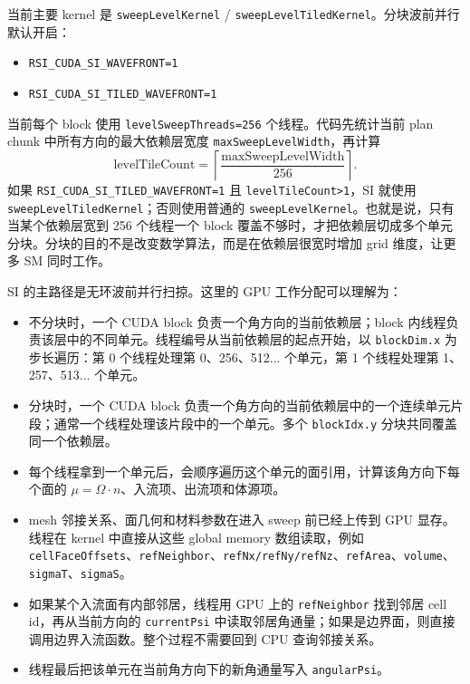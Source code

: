 \documentclass[10pt]{article}
\newcommand{\subsect}[1]{\vspace{2mm}{\sffamily\large\bfseries #1}\par}
\newcommand{\code}[1]{\texttt{#1}}
\begin{document}
当前主要 kernel 是 \code{sweepLevelKernel} / \code{sweepLevelTiledKernel}。分块波前并行默认开启：

\begin{itemize}
\item \code{RSI\_CUDA\_SI\_WAVEFRONT=1}
\item \code{RSI\_CUDA\_SI\_TILED\_WAVEFRONT=1}
\end{itemize}

当前每个 block 使用 \code{levelSweepThreads=256} 个线程。代码先统计当前 plan chunk 中所有方向的最大依赖层宽度 \code{maxSweepLevelWidth}，再计算
\[
\text{levelTileCount}=\left\lceil \frac{\text{maxSweepLevelWidth}}{256}\right\rceil .
\]
如果 \code{RSI\_CUDA\_SI\_TILED\_WAVEFRONT=1} 且 \code{levelTileCount>1}，SI 就使用 \code{sweepLevelTiledKernel}；否则使用普通的 \code{sweepLevelKernel}。也就是说，只有当某个依赖层宽到 256 个线程一个 block 覆盖不够时，才把依赖层切成多个单元分块。分块的目的不是改变数学算法，而是在依赖层很宽时增加 grid 维度，让更多 SM 同时工作。

\subsect{3.3 SI 中线程具体做什么}

SI 的主路径是无环波前并行扫掠。这里的 GPU 工作分配可以理解为：

\begin{itemize}
\item 不分块时，一个 CUDA block 负责一个角方向的当前依赖层；block 内线程负责该层中的不同单元。线程编号从当前依赖层的起点开始，以 \code{blockDim.x} 为步长遍历：第 0 个线程处理第 0、256、512... 个单元，第 1 个线程处理第 1、257、513... 个单元。
\item 分块时，一个 CUDA block 负责一个角方向的当前依赖层中的一个连续单元片段；通常一个线程处理该片段中的一个单元。多个 \code{blockIdx.y} 分块共同覆盖同一个依赖层。
\item 每个线程拿到一个单元后，会顺序遍历这个单元的面引用，计算该角方向下每个面的 $\mu=\Omega\cdot n$、入流项、出流项和体源项。
\item mesh 邻接关系、面几何和材料参数在进入 sweep 前已经上传到 GPU 显存。线程在 kernel 中直接从这些 global memory 数组读取，例如 \code{cellFaceOffsets}、\code{refNeighbor}、\code{refNx/refNy/refNz}、\code{refArea}、\code{volume}、\code{sigmaT}、\code{sigmaS}。
\item 如果某个入流面有内部邻居，线程用 GPU 上的 \code{refNeighbor} 找到邻居 cell id，再从当前方向的 \code{currentPsi} 中读取邻居角通量；如果是边界面，则直接调用边界入流函数。整个过程不需要回到 CPU 查询邻接关系。
\item 线程最后把该单元在当前角方向下的新角通量写入 \code{angularPsi}。
\end{itemize}
\end{document}

